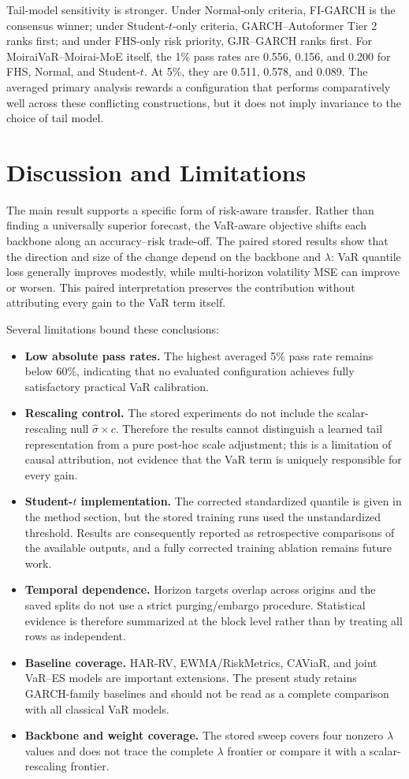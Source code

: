 \documentclass[runningheads]{llncs}
\begin{document}
Tail-model sensitivity is stronger. Under Normal-only criteria, FI-GARCH is the consensus winner; under Student-$t$-only criteria, GARCH--Autoformer Tier 2 ranks first; and under FHS-only risk priority, GJR--GARCH ranks first. For MoiraiVaR--Moirai-MoE itself, the 1\% pass rates are 0.556, 0.156, and 0.200 for FHS, Normal, and Student-$t$. At 5\%, they are 0.511, 0.578, and 0.089. The averaged primary analysis rewards a configuration that performs comparatively well across these conflicting constructions, but it does not imply invariance to the choice of tail model.

\section{Discussion and Limitations}
The main result supports a specific form of risk-aware transfer. Rather than finding a universally superior forecast, the VaR-aware objective shifts each backbone along an accuracy--risk trade-off. The paired stored results show that the direction and size of the change depend on the backbone and $\lambda$: VaR quantile loss generally improves modestly, while multi-horizon volatility MSE can improve or worsen. This paired interpretation preserves the contribution without attributing every gain to the VaR term itself.

Several limitations bound these conclusions:
\begin{itemize}
\item \textbf{Low absolute pass rates.} The highest averaged 5\% pass rate remains below 60\%, indicating that no evaluated configuration achieves fully satisfactory practical VaR calibration.
\item \textbf{Rescaling control.} The stored experiments do not include the scalar-rescaling null $\hat{\sigma}\times c$. Therefore the results cannot distinguish a learned tail representation from a pure post-hoc scale adjustment; this is a limitation of causal attribution, not evidence that the VaR term is uniquely responsible for every gain.
\item \textbf{Student-$t$ implementation.} The corrected standardized quantile is given in the method section, but the stored training runs used the unstandardized threshold. Results are consequently reported as retrospective comparisons of the available outputs, and a fully corrected training ablation remains future work.
\item \textbf{Temporal dependence.} Horizon targets overlap across origins and the saved splits do not use a strict purging/embargo procedure. Statistical evidence is therefore summarized at the block level rather than by treating all rows as independent.
\item \textbf{Baseline coverage.} HAR-RV, EWMA/RiskMetrics, CAViaR, and joint VaR--ES models are important extensions. The present study retains GARCH-family baselines and should not be read as a complete comparison with all classical VaR models.
\item \textbf{Backbone and weight coverage.} The stored sweep covers four nonzero $\lambda$ values and does not trace the complete $\lambda$ frontier or compare it with a scalar-rescaling frontier.
\end{itemize}
\end{document}
